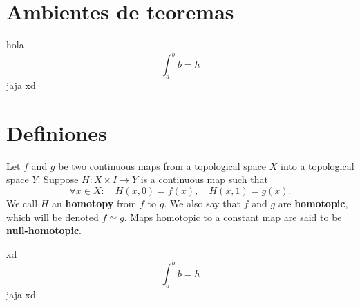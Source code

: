 \section{Ambientes de teoremas}

\lipsum[1]

\begin{theorem}
    hola \[\int_a^b b = h\]
    jaja xd
\end{theorem}


\section{Definiones}

\begin{definition}
    Let \(f\) and \(g\) be two continuous maps from a topological space \(X\) into a topological space \(Y\). Suppose \(H \colon X\times I \to Y\) is a continuous map such that 
    \[
        \forall x\in X :\quad H(x,0) = f(x), \quad H(x,1) = g(x).
    \]
    We call \(H\) an \textbf{homotopy} from \(f\) to \(g\). We also say that \(f\) and \(g\) are \textbf{homotopic}, which will be denoted \(f\simeq g\). Maps homotopic to a constant map are said to be \textbf{null-homotopic}.
\end{definition}


\lipsum[0]

\begin{theorem}
    xd \lipsum[1] \[\int_a^b b = h\]
    jaja xd
\end{theorem}



